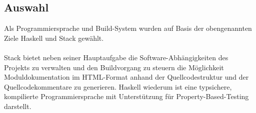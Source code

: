 \subsection{Auswahl}
Als Programmiersprache und Build-System wurden auf Basis der obengenannten Ziele
Haskell \cite{haskell} und Stack \cite{stack} gewählt.

\paragraph{}
Stack bietet neben seiner Hauptaufgabe die Software-Abhängigkeiten des Projekts
zu verwalten und den Buildvorgang zu steuern die Möglichkeit Moduldokumentation
im HTML-Format anhand der Quellcodestruktur und der Quellcodekommentare zu generieren.
Haskell wiederum ist eine typsichere, kompilierte Programmiersprache mit Unterstützung
für \gls{Property-Based-Testing} darstellt.